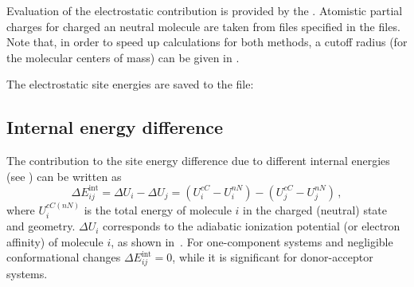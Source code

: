 Evaluation of the electrostatic contribution is provided by the  \calculator. Atomistic partial charges for charged an neutral molecule are taken from files specified in the \xmlsegments files. Note that, in order to speed up calculations for both methods, a cutoff radius (for the molecular centers of mass) can be given in  \xmloptions.

The electrostatic site energies are saved to the \sqlstate file:

{\noindent \small \ctprun \opt \xmloptions  \seg  \xmlsegments \sql  \sqlstate \exe  {} }

\subsection{Internal energy difference}
\label{sec:internal_energy}

The contribution to the site energy difference due to different internal energies (see ) can be written as
\begin{equation}
 \Delta E_{ij}^\text{int}=
\Delta U_i - \Delta U_j = \left( U_{i}^{cC}-U_{i}^{nN}\right) - \left( U_{j}^{cC}-U_{j}^{nN}\right) \, ,
\label{equ:conformational}
\end{equation}
where $U_{i}^{cC(nN)}$ is the total energy of molecule $i$ in the charged (neutral) state and geometry.  $\Delta U_{i}$ corresponds to the adiabatic ionization potential (or electron affinity) of molecule $i$, as shown in~. For one-component systems and negligible conformational changes $ \Delta E_{ij}^\text{int}=0$, while it is significant for donor-acceptor systems.
